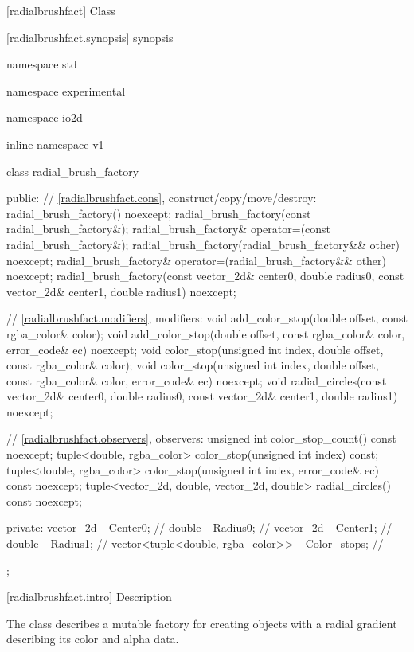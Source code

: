  [radialbrushfact] {Class }

 [radialbrushfact.synopsis] { synopsis}

\begin{codeblock}
namespace std { namespace experimental { namespace io2d { inline namespace v1 {
  class radial_brush_factory {
  public:
    // \ref{radialbrushfact.cons}, construct/copy/move/destroy:
    radial_brush_factory() noexcept;
    radial_brush_factory(const radial_brush_factory&);
    radial_brush_factory& operator=(const radial_brush_factory&);
    radial_brush_factory(radial_brush_factory&& other) noexcept;
    radial_brush_factory& operator=(radial_brush_factory&& other) noexcept;
    radial_brush_factory(const vector_2d& center0, double radius0,
      const vector_2d& center1, double radius1) noexcept;

    // \ref{radialbrushfact.modifiers}, modifiers:
    void add_color_stop(double offset, const rgba_color& color);
    void add_color_stop(double offset, const rgba_color& color,
      error_code& ec) noexcept;
    void color_stop(unsigned int index, double offset, const rgba_color& color);
    void color_stop(unsigned int index, double offset, const rgba_color& color,
      error_code& ec) noexcept;
    void radial_circles(const vector_2d& center0, double radius0,
      const vector_2d& center1, double radius1) noexcept;

    // \ref{radialbrushfact.observers}, observers:
    unsigned int color_stop_count() const noexcept;
    tuple<double, rgba_color> color_stop(unsigned int index) const;
    tuple<double, rgba_color> color_stop(unsigned int index,
      error_code& ec) const noexcept;
    tuple<vector_2d, double, vector_2d, double> radial_circles() const noexcept;

  private:
    vector_2d _Center0;                             // \expos
    double _Radius0;                                // \expos
    vector_2d _Center1;                             // \expos
    double _Radius1;                                // \expos
    vector<tuple<double, rgba_color>> _Color_stops; // \expos
  };
} } } }
\end{codeblock}

 [radialbrushfact.intro] { Description}

\pnum
{}
The class  describes a mutable factory for creating  objects with a radial gradient describing its color and alpha data.

